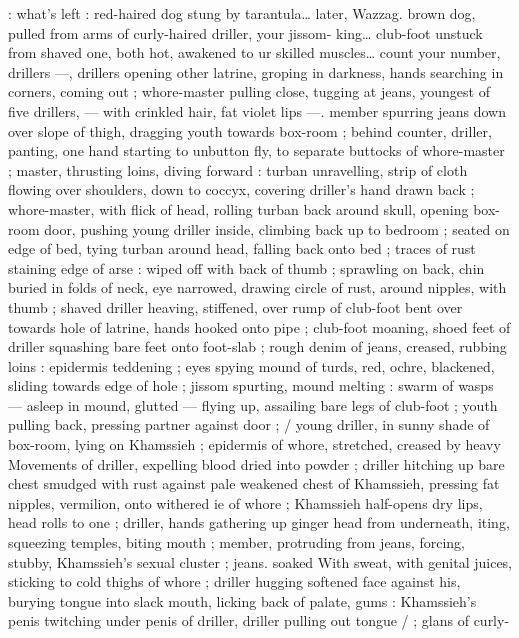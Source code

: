: what's left : red-haired dog stung by tarantula{\ldots} later, Wazzag. 
brown dog, pulled from arms of curly-haired driller, your jissom- 
king{\ldots} club-foot unstuck from shaved one, both hot, awakened to 
ur skilled muscles{\ldots} count your number, drillers{\td} {\gr} ---, drillers 
opening other latrine, groping in darkness, hands searching in 
corners, coming out ; whore-master pulling close, tugging at jeans, 
youngest of five drillers, --- with crinkled hair, fat violet lips ---. 
member spurring jeans down over slope of thigh, dragging youth 
towards box-room ; behind counter, driller, panting, one hand 
starting to unbutton fly, to separate buttocks of whore-master ; 
master, thrusting loins, diving forward : turban unravelling, strip of 
cloth flowing over shoulders, down to coccyx, covering driller's hand 
drawn back ; whore-master, with flick of head, rolling turban back 
around skull, opening box-room door, pushing young driller inside, 
climbing back up to bedroom ; seated on edge of bed, tying turban 
around head, falling back onto bed ; traces of rust staining edge of 
arse : wiped off with back of thumb ; sprawling on back, chin buried 
in folds of neck, eye narrowed, drawing circle of rust, around 
nipples, with thumb ; shaved driller heaving, stiffened, over rump of 
club-foot bent over towards hole of latrine, hands hooked onto pipe 
; club-foot moaning, shoed feet of driller squashing bare feet onto 
foot-slab ; rough denim of jeans, creased, rubbing loins : epidermis 
teddening ; eyes spying mound of turds, red, ochre, blackened, 
sliding towards edge of hole ; jissom spurting, mound melting : 
swarm of wasps --- asleep in mound, glutted --- flying up, assailing 
bare legs of club-foot ; youth pulling back, pressing partner against 
door ; {\slash} young driller, in sunny shade of box-room, lying on 
Khamssieh ; epidermis of whore, stretched, creased by heavy 
Movements of driller, expelling blood dried into powder ; driller 
hitching up bare chest smudged with rust against pale weakened 
chest of Khamssieh, pressing fat nipples, vermilion, onto withered 
ie of whore ; Khamssieh half-opens dry lips, head rolls to one 
; driller, hands gathering up ginger head from underneath, 
iting, squeezing temples, biting mouth ; member, protruding from 
jeans, forcing, stubby, Khamssieh's sexual cluster ; jeans. soaked 
With sweat, with genital juices, sticking to cold thighs of whore ; 
driller hugging softened face against his, burying tongue into slack 
mouth, licking back of palate, gums : Khamssieh's penis twitching 
under penis of driller, driller pulling out tongue {\slash} ; glans of curly- 

